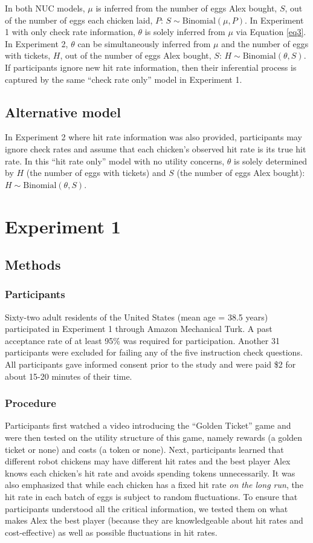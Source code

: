 \documentclass[10pt,letterpaper]{article}
\begin{document}
In both NUC models, $\mu$ is inferred from the number of eggs Alex bought, $S$, out of the number of eggs each chicken laid, $P$: $S \sim \mathrm{Binomial}(\mu, P)$. In Experiment 1 with only check rate information, $\theta$ is solely inferred from $\mu$ via Equation \ref{eq3}. In Experiment 2, $\theta$ can be simultaneously inferred from $\mu$ and the number of eggs with tickets, $H$, out of the number of eggs Alex bought, $S$: $H \sim \mathrm{Binomial}(\theta, S)$. If participants ignore new hit rate information, then their inferential process is captured by the same ``check rate only'' model in Experiment 1.

\subsection{Alternative model}
In Experiment 2 where hit rate information was also provided, participants may ignore check rates and assume that each chicken's observed hit rate is its true hit rate. In this ``hit rate only'' model with no utility concerns, $\theta$ is solely determined by $H$ (the number of eggs with tickets) and $S$ (the number of eggs Alex bought): $H \sim \mathrm{Binomial}(\theta, S)$.

\section{Experiment 1}
\subsection{Methods}
\subsubsection{Participants} 
Sixty-two adult residents of the United States (mean age = 38.5 years) participated in Experiment 1 through Amazon Mechanical Turk. A past acceptance rate of at least 95\% was required for participation. Another 31 participants were excluded for failing any of the five instruction check questions. All participants gave informed consent prior to the study and were paid \$2 for about 15-20 minutes of their time. 

\subsubsection{Procedure} 
Participants first watched a video introducing the ``Golden Ticket'' game and were then tested on the utility structure of this game, namely rewards (a golden ticket or none) and costs (a token or none). Next, participants learned that different robot chickens may have different hit rates and the best player Alex knows each chicken's hit rate and avoids spending tokens unnecessarily. It was also emphasized that while each chicken has a fixed hit rate \emph{on the long run}, the hit rate in each batch of eggs is subject to random fluctuations. To ensure that participants understood all the critical information, we tested them on what makes Alex the best player (because they are knowledgeable about hit rates and cost-effective) as well as possible fluctuations in hit rates.
\end{document}
